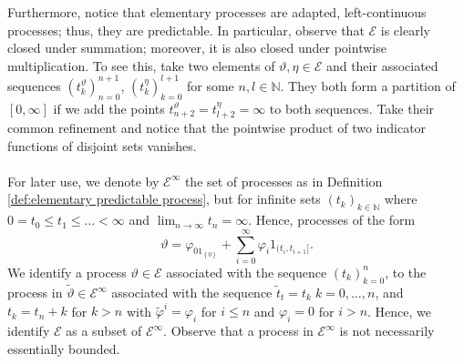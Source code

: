 \documentclass[11pt,a4paper,twoside,openany]{report}
\numberwithin{equation}{section}
\theoremstyle{plain} %
\theoremstyle{definition} %
\theoremstyle{remark} %
\begin{document}
Furthermore, notice that elementary processes are adapted, left-continuous processes; thus, they are predictable. In particular, observe that \(\mathcal{E}\) is clearly closed under summation; moreover, it is also closed under pointwise multiplication. To see this, take two elements of \(\vartheta,\eta\in\mathcal{E}\) and their associated sequences \((t^\vartheta_k)_{n=0}^{n+1}\), \((t^\eta_k)_{k=0}^{l+1}\) for some \(n,l\in\mathbb{N}\). They both form a partition of \([0,\infty]\) if we add the points \(t^{\vartheta
}_{n+2}=t^{\eta}_{l+2}=\infty\) to both sequences. Take their common refinement and notice that the pointwise product of two indicator functions of disjoint sets vanishes.
\\\\
For later use, we denote by \(\mathcal{E}^{\infty}\) the set of processes as in Definition \ref{def:elementary predictable process}, but for infinite sets \((t_k)_{k\in\mathbb{N}}\) where \(0=t_0\leq t_1\leq\dots<\infty\) and \(\lim_{n\to\infty}t_n=\infty\). Hence, processes of the form 
\begin{equation}
      \vartheta = \varphi_01_{\left\{0\right\}}+\sum_{i= 0}^\infty \varphi_i1_{(t_i,t_{i+1}]}.
\end{equation}
We identify a process \(\vartheta\in\mathcal{E}\) associated with the sequence \((t_k)_{k=0}^n\), to the process in \(\widetilde{\vartheta}\in\mathcal{E}^{\infty}\) associated with the sequence \(\tilde{t}_t=t_k\; k=0,\dots,n\), and \(t_k = t_n+k\) for \(k>n\) with \(\widetilde{\varphi}^i=\varphi_i\) for \(i\leq n\) and \(\varphi_i=0\) for \(i>n\). Hence, we identify \(\mathcal{E}\) as a subset of \(\mathcal{E}^{\infty}\). Observe that a process in \(\mathcal{E}^{\infty}\) is not necessarily essentially bounded. 
\end{document}
